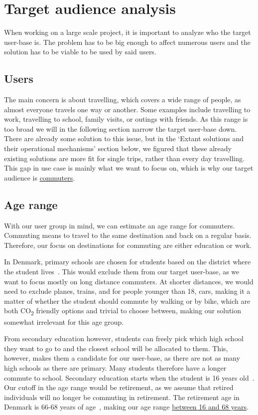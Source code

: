 \section{Target audience analysis}\label{sec:target-audience-analysis}

When working on a large scale project, it is important to analyze who the target user-base is.
The problem has to be big enough to affect numerous users and the solution has to be viable to be used by said
users.

\subsection{Users}\label{subsec:users}

The main concern is about travelling, which covers a wide range of people, as almost everyone travels one way or
another.
Some examples include travelling to work, travelling to school, family visits, or outings with friends.
As this range is too broad we will in the following section narrow the target user-base down.
There are already some solution to this issue, but in the `Extant solutions and their operational mechanisms' section
below, we figured that these already existing solutions are more fit for single trips, rather than every day travelling.
This gap in use case is mainly what we want to focus on, which is why our target audience is \underline{commuters}.

\subsection{Age range}\label{subsec:age-range}

With our user group in mind, we can estimate an age range for commuters.
Commuting means to travel to the same destination and back on a regular basis.
Therefore, our focus on destinations for commuting are either education or work.

In Denmark, primary schools are chosen for students based on the district where the student lives~\cite{primary_school}.
This would exclude them from our target user-base, as we want to focus mostly on long distance commuters.
At shorter distances, we would need to exclude planes, trains, and for people younger than 18, cars, making it a matter
of whether the student should commute by walking or by bike, which are both \unit{CO_{2}} friendly options and trivial
to choose between, making our solution somewhat irrelevant for this age group.

From secondary education however, students can freely pick which high school they want to go to and the closest school
will be allocated to them.
This, however, makes them a candidate for our user-base, as there are not as many high schools as there are primary.
Many students therefore have a longer commute to school.
Secondary education starts when the student is 16 years old~\cite{secondary_school}.
Our cutoff in the age range would be retirement, as we assume that retired individuals will no longer be commuting in
retirement.
The retirement age in Denmark is 66-68 years of age~\cite{retirement}, making our age range
\underline{between 16 and 68 years}.

